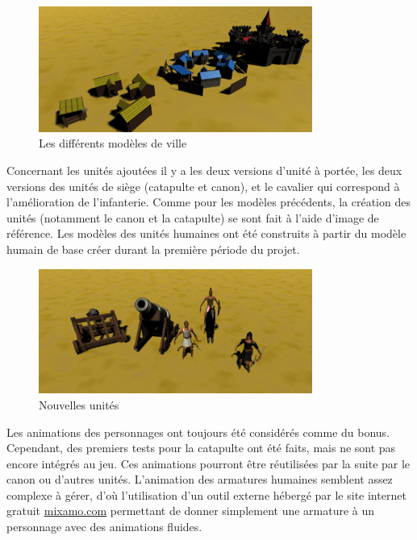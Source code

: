 \documentclass[12pt]{report}
\begin{document}
\begin{figure}[H]
    \centering
    \includegraphics[width=0.8\textwidth]{AllCitiesScreen}
    \caption{Les différents modèles de ville}
\end{figure}

Concernant les unités ajoutées il y a les deux versions d’unité à portée, les
deux versions des unités de siège (catapulte et canon), et le cavalier qui
correspond à l’amélioration de l’infanterie. Comme pour les modèles précédents,
la création des unités (notamment le canon et la catapulte) se sont fait à
l’aide d’image de référence. Les modèles des unités humaines ont été construits
à partir du modèle humain de base créer durant la première période du projet.

\begin{figure}[H]
    \centering
    \includegraphics[width=0.8\textwidth]{NewUnits}
    \caption{Nouvelles unités}
\end{figure}

Les animations des personnages ont toujours été considérés comme du bonus.
Cependant, des premiers tests pour la catapulte ont été faits, mais ne sont pas
encore intégrés au jeu. Ces animations pourront être réutilisées par la suite
par le canon ou d'autres unités. L'animation des armatures humaines semblent
assez complexe à gérer, d'où l'utilisation d'un outil externe hébergé par le
site internet gratuit \url{mixamo.com} permettant de donner simplement une
armature à un personnage avec des animations fluides.
\end{document}
